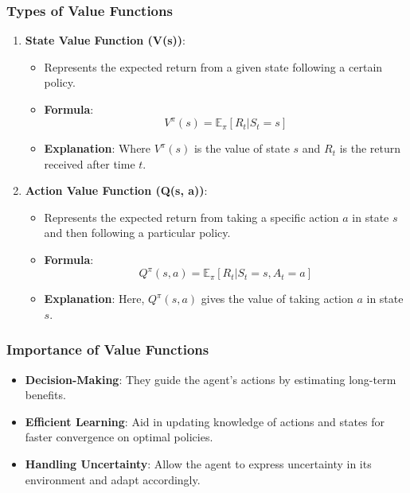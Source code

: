 \documentclass{beamer}
\begin{document}
\begin{frame}[fragile]
    \frametitle{Types of Value Functions}
    \begin{enumerate}
        \item \textbf{State Value Function (V(s))}:
            \begin{itemize}
                \item Represents the expected return from a given state following a certain policy.
                \item \textbf{Formula}:
                \begin{equation}
                V^{\pi}(s) = \mathbb{E}_{\pi} [ R_t | S_t = s ]
                \end{equation}
                \item \textbf{Explanation}: Where \( V^{\pi}(s) \) is the value of state \( s \) and \( R_t \) is the return received after time \( t \).
            \end{itemize}
        
        \item \textbf{Action Value Function (Q(s, a))}:
            \begin{itemize}
                \item Represents the expected return from taking a specific action \( a \) in state \( s \) and then following a particular policy.
                \item \textbf{Formula}:
                \begin{equation}
                Q^{\pi}(s, a) = \mathbb{E}_{\pi} [ R_t | S_t = s, A_t = a ]
                \end{equation}
                \item \textbf{Explanation}: Here, \( Q^{\pi}(s, a) \) gives the value of taking action \( a \) in state \( s \).
            \end{itemize}
    \end{enumerate}
\end{frame}

\begin{frame}[fragile]
    \frametitle{Importance of Value Functions}
    \begin{itemize}
        \item \textbf{Decision-Making}: They guide the agent's actions by estimating long-term benefits.
        \item \textbf{Efficient Learning}: Aid in updating knowledge of actions and states for faster convergence on optimal policies.
        \item \textbf{Handling Uncertainty}: Allow the agent to express uncertainty in its environment and adapt accordingly.
    \end{itemize}
\end{frame}
\end{document}
